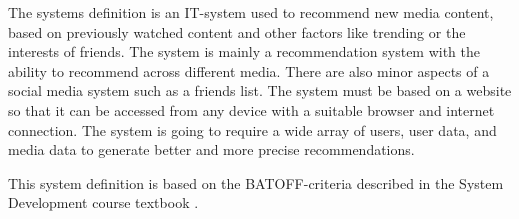 The systems definition is an IT-system used to recommend new media content, based on previously watched content and other factors like trending or the interests of friends. The system is mainly a recommendation system with the ability to recommend across different media. There are also minor aspects of a social media system such as a friends list. The system must be based on a website so that it can be accessed from any device with a suitable browser and internet connection. The system is going to require a wide array of users, user data, and media data to generate better and more precise recommendations.

This system definition is based on the BATOFF-criteria described in the System Development course textbook \cite{ObjektAnalyseDesign}.